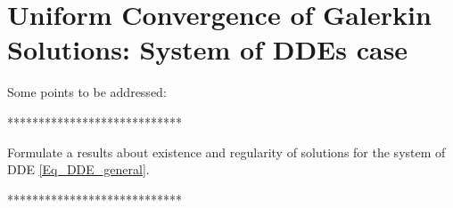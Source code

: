
\section{Uniform Convergence of Galerkin Solutions: System of DDEs case} \label{Sect_convergence_system_case}



{\alert Some points to be addressed: 

****************************

\bi
\item Formulate a results about existence and regularity of solutions for the system of DDE \eqref{Eq_DDE_general}.
\ei

****************************}